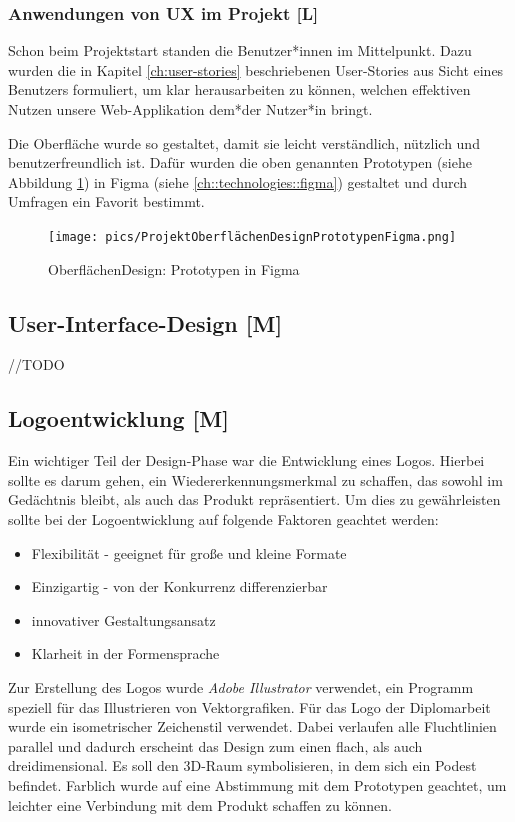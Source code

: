 \subsubsection{Anwendungen von UX im Projekt [L]}
Schon beim Projektstart standen die Benutzer*innen im Mittelpunkt. Dazu wurden die in Kapitel \ref{ch:user-stories} beschriebenen User-Stories aus Sicht eines Benutzers formuliert, um klar herausarbeiten zu können, welchen effektiven Nutzen unsere Web-Applikation dem*der Nutzer*in bringt.

Die Oberfläche wurde so gestaltet, damit sie leicht verständlich, nützlich und benutzerfreundlich ist. Dafür wurden die oben genannten Prototypen (siehe Abbildung \ref{fig:impl:design:prototypesfigma}) in Figma (siehe \ref{ch::technologies::figma}) gestaltet und durch Umfragen ein Favorit bestimmt.

\begin{figure}
    \centering
    \texttt{[image: pics/ProjektOberflächenDesignPrototypenFigma.png]}
    \caption{OberflächenDesign: Prototypen in Figma}
    \label{fig:impl:design:prototypesfigma}
\end{figure}

\subsection{User-Interface-Design [M]}
//TODO

\subsection{Logoentwicklung [M]}
Ein wichtiger Teil der Design-Phase war die Entwicklung eines Logos. Hierbei sollte es darum gehen, ein Wiedererkennungsmerkmal zu schaffen, das sowohl im Gedächtnis bleibt, als auch das Produkt repräsentiert. Um dies zu gewährleisten sollte bei der Logoentwicklung auf folgende Faktoren geachtet werden:

\begin{itemize}
    \item Flexibilität - geeignet für große und kleine Formate
    \item Einzigartig - von der Konkurrenz differenzierbar
    \item innovativer Gestaltungsansatz
    \item Klarheit in der Formensprache
\end{itemize}
\cite{LogoKriterien}

Zur Erstellung des Logos wurde \emph{Adobe Illustrator} verwendet, ein Programm speziell für das Illustrieren von Vektorgrafiken. Für das Logo der Diplomarbeit wurde ein isometrischer Zeichenstil verwendet. Dabei verlaufen alle Fluchtlinien parallel und dadurch erscheint das Design zum einen flach, als auch dreidimensional. Es soll den 3D-Raum symbolisieren, in dem sich ein Podest befindet. Farblich wurde auf eine Abstimmung mit dem Prototypen geachtet, um leichter eine Verbindung mit dem Produkt schaffen zu können.
\cite{IsometricStyle}
\cite{Logo}

